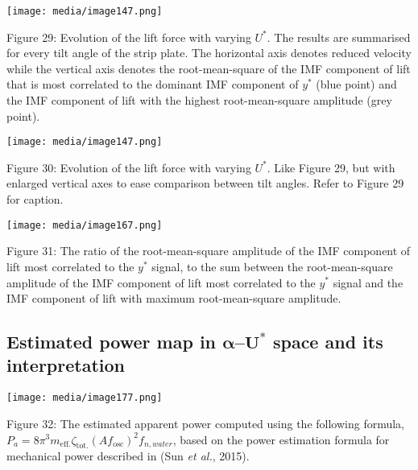 \documentclass[]{article}
\begin{document}
\texttt{[image: media/image147.png]}

\protect\hypertarget{_Ref39495423}{}{\protect\hypertarget{_Toc41048849}{}{}}Figure
29: Evolution of the lift force with varying \(U^{*}\). The results are
summarised for every tilt angle of the strip plate. The horizontal axis
denotes reduced velocity while the vertical axis denotes the
root-mean-square of the IMF component of lift that is most correlated to
the dominant IMF component of \(y^{*}\) (blue point) and the IMF
component of lift with the highest root-mean-square amplitude (grey
point).

\texttt{[image: media/image147.png]}

\protect\hypertarget{_Toc41048850}{}{}Figure 30: Evolution of the lift
force with varying \(U^{*}\). Like Figure 29, but with enlarged vertical
axes to ease comparison between tilt angles. Refer to Figure 29 for
caption.

\texttt{[image: media/image167.png]}

\protect\hypertarget{_Toc41048851}{}{}Figure 31: The ratio of the
root-mean-square amplitude of the IMF component of lift most correlated
to the \(y^{*}\) signal, to the sum between the root-mean-square
amplitude of the IMF component of lift most correlated to the \(y^{*}\)
signal and the IMF component of lift with maximum root-mean-square
amplitude.

\hypertarget{estimated-power-map-in-mathbfalphamathbfumathbf-space-and-its-interpretation}{\subsection{\texorpdfstring{Estimated
power map in \(\mathbf{\alpha}\)--\(\mathbf{U}^{\mathbf{*}}\) space and
its
interpretation}{Estimated power map in \textbackslash{}mathbf\{\textbackslash{}alpha\}--\textbackslash{}mathbf\{U\}\^{}\{\textbackslash{}mathbf\{*\}\} space and its interpretation}}\label{estimated-power-map-in-mathbfalphamathbfumathbf-space-and-its-interpretation}}

\texttt{[image: media/image177.png]}

\protect\hypertarget{_Toc41048852}{}{}Figure 32: The estimated apparent
power computed using the following formula,
\(P_{a} = 8\pi^{3}m_{\text{eff.}}\zeta_{\text{tot.}}\left( Af_{\text{osc}} \right)^{2}f_{n,water}\),
based on the power estimation formula for mechanical power described in
(Sun \emph{et al.}, 2015).
\end{document}

